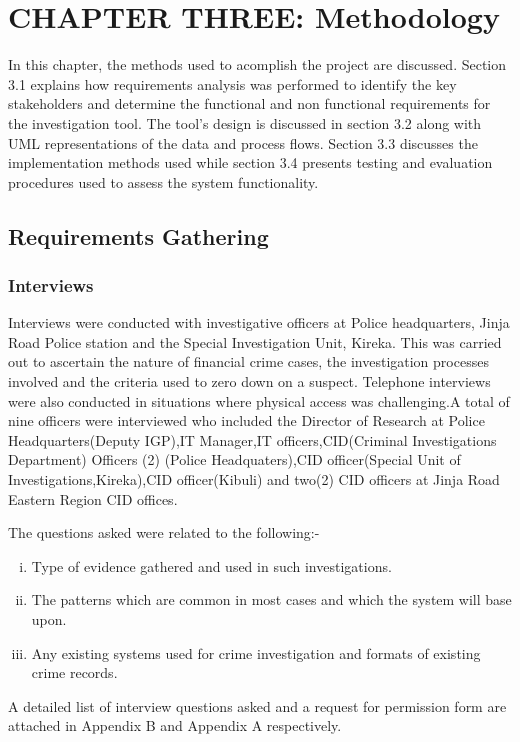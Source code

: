 
\section{CHAPTER THREE: Methodology}

\noindent In this chapter, the methods used to acomplish the project are discussed. Section 3.1 explains how requirements analysis was performed to identify the key stakeholders and determine the functional and non functional requirements for the investigation tool. The tool's design is discussed in section 3.2 along with UML representations of the data and process flows. Section 3.3 discusses the implementation methods used while section 3.4 presents testing and evaluation procedures used to assess the system functionality.

\subsection{Requirements Gathering}
\subsubsection{Interviews}
\noindent Interviews were conducted with investigative officers at Police headquarters, Jinja Road Police station and the Special Investigation Unit, Kireka. This was carried out to ascertain the nature of financial crime cases, the investigation processes involved and the criteria used to zero down on a suspect. Telephone interviews were also conducted in situations where physical access was challenging.A total of nine officers were interviewed who included the Director of Research at Police Headquarters(Deputy IGP),IT Manager,IT officers,CID(Criminal Investigations Department) Officers (2) (Police Headquaters),CID officer(Special Unit of Investigations,Kireka),CID officer(Kibuli) and two(2) CID officers at Jinja Road Eastern Region CID offices. 

The questions asked were related to the following:-
\begin{enumerate}[(i)]
\item Type of evidence gathered and used in such investigations.
\item The patterns which are common in most cases and which the system will base upon.
\item Any existing systems used for crime investigation and formats of existing crime records.
 \end{enumerate}

\noindent A detailed list of  interview questions asked and a request for permission form are attached in  Appendix B and Appendix A respectively.

